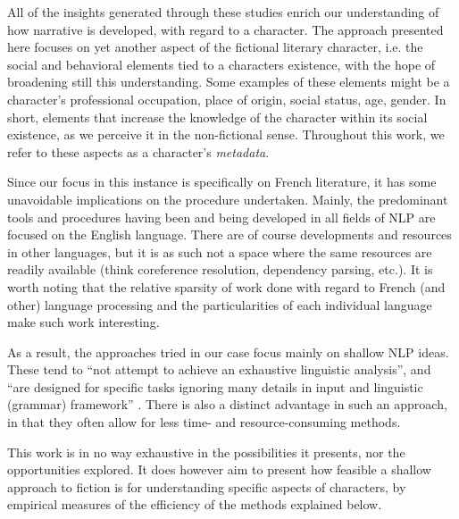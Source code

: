 All of the insights generated through these studies enrich our understanding of how narrative is developed, with regard to a character. The approach presented here focuses on yet another aspect of the fictional literary character, i.e. the social and behavioral elements tied to a characters existence, with the hope of broadening still this understanding. Some examples of these elements might be a character's professional occupation, place of origin, social status, age, gender. In short, elements that increase the knowledge of the character within its social existence, as we perceive it in the non-fictional sense. Throughout this work, we refer to these aspects as a character's \textit{metadata}.

Since our focus in this instance is specifically on French literature, it has some unavoidable implications on the procedure undertaken. Mainly, the predominant tools and procedures having been and being developed in all fields of NLP are focused on the English language. There are of course developments and resources in other languages, but it is as such not a space where the same resources are readily available (think coreference resolution, dependency parsing, etc.). It is worth noting that the relative sparsity of work done with regard to French (and other) language processing and the particularities of each individual language make such work interesting. 

As a result, the approaches tried in our case focus mainly on shallow NLP ideas. These tend to ``not attempt to achieve an exhaustive linguistic analysis'', and ``are designed for specific tasks ignoring many details in input and linguistic (grammar) framework'' \cite{schafer2007integrating}. There is also a distinct advantage in such an approach, in that they often allow for less time- and resource-consuming methods. 

This work is in no way exhaustive in the possibilities it presents, nor the opportunities explored. It does however aim to present how feasible a shallow approach to fiction is for understanding specific aspects of characters, by empirical measures of the efficiency of the methods explained below.